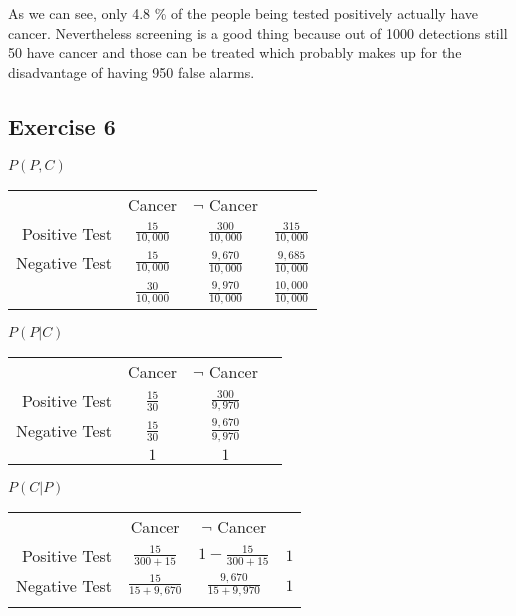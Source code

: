 As we can see, only 4.8 \% of the people being tested positively actually have cancer. Nevertheless screening is a good thing because out of 1000 detections still 50 have cancer and those can be treated which probably makes up for the disadvantage of having 950 false alarms.  

\subsection*{Exercise 6}
\textbf{$P(P, C)$}
\begin{tabular}{ r|c|c|l }
\multicolumn{1}{r}{}
      &  \multicolumn{1}{c}{Cancer}
               &  \multicolumn{1}{c}{$\neg$ Cancer} \\
               \cline{2-3}
Positive Test  & $\frac{15}{10,000}$ & $\frac{  300}{10,000}$     & $\frac{  315}{10,000}$\\ 
               \cline{2-3}
Negative Test  & $\frac{15}{10,000}$ & $\frac{9,670}{10,000}$     & $\frac{9,685}{10,000}$\\
               \cline{2-3}
\multicolumn{1}{r}{} 
      & \multicolumn{1}{c}{$\frac{30}{10,000}$} 
              & \multicolumn{1}{c}{$\frac{9,970}{10,000}$}
                      & \multicolumn{1}{c}{$\frac{10,000}{10,000}$}\\
\end{tabular}

\textbf{$P(P|C)$}
\begin{tabular}{ r|c|c|l }
\multicolumn{1}{r}{}
      &  \multicolumn{1}{c}{Cancer}
               &  \multicolumn{1}{c}{$\neg$ Cancer} \\
               \cline{2-3}
Positive Test  & $\frac{15}{30}$ & $\frac{ 300}{9,970}$     & \\ 
               \cline{2-3}
Negative Test  & $\frac{15}{30}$ & $\frac{9,670}{9,970}$     & \\
               \cline{2-3}
\multicolumn{1}{r}{} 
      & \multicolumn{1}{c}{$1$} 
              & \multicolumn{1}{c}{$1$} 
                      & \multicolumn{1}{c}{}\\
\end{tabular}

\textbf{$P(C|P)$}
\begin{tabular}{ r|c|c|l }
\multicolumn{1}{r}{}
      &  \multicolumn{1}{c}{Cancer}
               &  \multicolumn{1}{c}{$\neg$ Cancer} \\
               \cline{2-3}
Positive Test  & $\frac{15}{300 + 15}$   & $1 - \frac{15}{300+15}$  & $1$\\ 
               \cline{2-3}
Negative Test  & $\frac{15}{15 + 9,670}$ & $\frac{9,670}{15+9,970}$ & $1$\\
               \cline{2-3}
\multicolumn{1}{r}{} 
      & \multicolumn{1}{c}{} 
              & \multicolumn{1}{c}{} 
                      & \multicolumn{1}{c}{}\\
\end{tabular}

